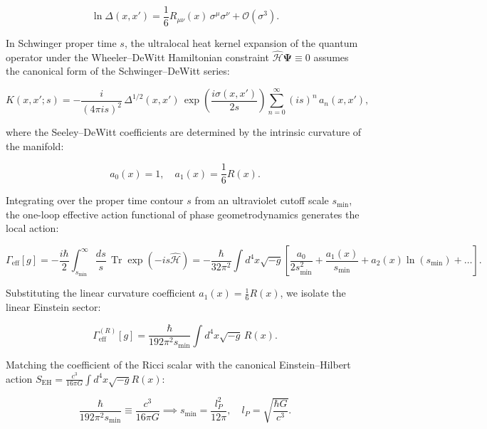 \documentclass[11pt,a4paper]{article}
\theoremstyle{definition}
\begin{document}
\begin{equation}\label{eq:1.63b}\tag{1.63b}
\ln \Delta(x, x') = \frac{1}{6} R_{\mu\nu}(x) \, \sigma^\mu \sigma^\nu + \mathcal{O}(\sigma^3).
\end{equation}

In Schwinger proper time $s$, the ultralocal heat kernel expansion of the quantum operator under the Wheeler--DeWitt Hamiltonian constraint $\hat{\mathcal{H}}\mathbf{\Psi} \equiv 0$ assumes the canonical form of the Schwinger--DeWitt series:

\begin{equation}\label{eq:1.63c}\tag{1.63c}
K(x, x'; s) = -\frac{i}{(4\pi i s)^2} \, \Delta^{1/2}(x, x') \, \exp\left( \frac{i \sigma(x, x')}{2s} \right) \sum_{n=0}^\infty (i s)^n \, a_n(x, x'),
\end{equation}

where the Seeley--DeWitt coefficients are determined by the intrinsic curvature of the manifold:

\begin{equation}\label{eq:1.63d}\tag{1.63d}
a_0(x) = 1, \quad a_1(x) = \frac{1}{6} R(x).
\end{equation}

Integrating over the proper time contour $s$ from an ultraviolet cutoff scale $s_{\text{min}}$, the one-loop effective action functional of phase geometrodynamics generates the local action:

\begin{equation}\label{eq:1.63e}\tag{1.63e}
\Gamma_{\text{eff}}[g] = -\frac{i\hbar}{2} \int_{s_{\text{min}}}^\infty \frac{ds}{s} \, \operatorname{Tr} \exp(-i s \hat{\mathcal{H}}) = -\frac{\hbar}{32\pi^2} \int d^4x \sqrt{-g} \left[ \frac{a_0}{2 s_{\text{min}}^2} + \frac{a_1(x)}{s_{\text{min}}} + a_2(x) \ln(s_{\text{min}}) + \dots \right].
\end{equation}

Substituting the linear curvature coefficient $a_1(x) = \frac{1}{6} R(x)$, we isolate the linear Einstein sector:

\begin{equation}\label{eq:1.63f}\tag{1.63f}
\Gamma_{\text{eff}}^{(R)}[g] = \frac{\hbar}{192 \pi^2 s_{\text{min}}} \int d^4x \sqrt{-g} \, R(x).
\end{equation}

Matching the coefficient of the Ricci scalar with the canonical Einstein--Hilbert action $S_{\text{EH}} = \frac{c^3}{16\pi G} \int d^4x \sqrt{-g} R(x)$:

\begin{equation}\label{eq:1.63g}\tag{1.63g}
\frac{\hbar}{192 \pi^2 s_{\text{min}}} \equiv \frac{c^3}{16\pi G} \implies s_{\text{min}} = \frac{l_P^2}{12\pi}, \quad l_P = \sqrt{\frac{\hbar G}{c^3}}.
\end{equation}
\end{document}

